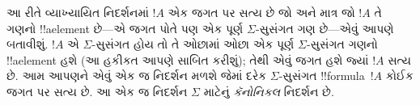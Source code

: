 \documentclass[../../../include/open-logic-section]{subfiles}
\begin{document}

આ રીતે વ્યાખ્યાયિત નિદર્શનમાં $!A$ એક જગત પર સત્ય છે જો અને માત્ર
જો $!A$ તે ગણનો !!a{element} છે—એ જગત પોતે પણ એક પૂર્ણ
$\Sigma$-સુસંગત ગણ છે—એવું આપણે બતાવીશું. $!A$ એ
$\Sigma$-સુસંગત હોય તો તે ઓછામાં ઓછા એક પૂર્ણ $\Sigma$-સુસંગત
ગણનો !!a{element} હશે (આ હકીકત આપણે સાબિત કરીશું); તેથી એવું
જગત હશે જ્યાં $!A$ સત્ય છે. આમ આપણને એવું એક જ નિદર્શન મળશે જેમાં
દરેક $\Sigma$-સુસંગત !!{formula}~$!A$ કોઈક જગત પર સત્ય છે.
આ એક જ નિદર્શન $\Sigma$ માટેનું \emph{કૅનોનિકલ} નિદર્શન છે.
\end{document}
